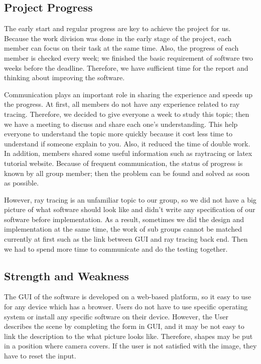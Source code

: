 \documentclass[a4paper, 12pt]{article}
\begin{document}
\subsection{Project Progress}
The early start and regular progress are key to achieve the project for us. Because the work division was done in the early stage of the project, each member can focus on their task at the same time. Also, the progress of each member is checked every week; we finished the basic requirement of software two weeks before the deadline. Therefore, we have sufficient time for the report and thinking about improving the software.

Communication plays an important role in sharing the experience and speeds up the progress. At first, all members do not have any experience related to ray tracing. Therefore, we decided to give everyone a week to study this topic; then we have a meeting to discuss and share each one’s understanding. This help everyone to understand the topic more quickly because it cost less time to understand if someone explain to you. Also, it reduced the time of double work. In addition, members shared some useful information such as raytracing or latex tutorial website. Because of frequent communication, the status of progress is known by all group member; then the problem can be found and solved as soon as possible.

However, ray tracing is an unfamiliar topic to our group, so we did not have a big picture of what software should look like and didn’t write any specification of our software before implementation. As a result, sometimes we did the design and implementation at the same time, the work of sub groups cannot be matched currently at first such as the link between GUI and ray tracing back end. Then we had to spend more time to communicate and do the testing together.

\subsection{Strength and Weakness}
The GUI of the software is developed on a web-based platform, so it easy to use for any device which has a browser. Users do not have to use specific operating system or install any specific software on their device. However, the User describes the scene by completing the form in GUI, and it may be not easy to link the description to the what picture looks like. Therefore, shapes may be put in a position where camera covers. If the user is not satisfied with the image, they have to reset the input.
\end{document}
